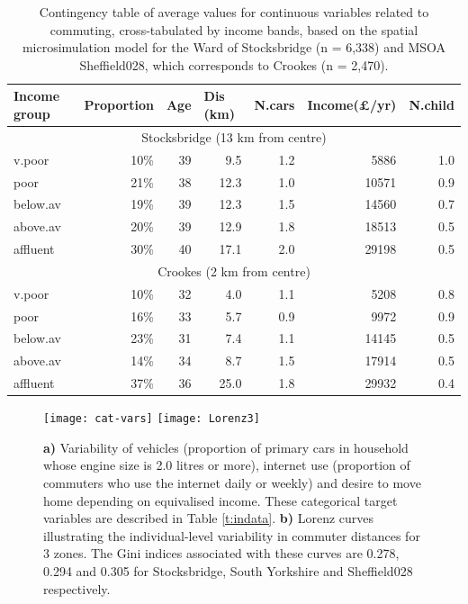 \begin{table}[h*]
\caption[Commuting characteristics cross-tabulated by income bands]
{Contingency table of average values for continuous variables related to commuting,
cross-tabulated by income bands, based on the spatial microsimulation
model for the Ward of Stocksbridge (n = 6,338) and MSOA Sheffield028, which
corresponds to Crookes (n = 2,470).}
\begin{center}
\begin{tabular}{lrrrrrr}
\toprule
Income group & \multicolumn{1}{l}{Proportion} & \multicolumn{1}{l}{Age} &
\multicolumn{1}{l}{Dis (km)} & \multicolumn{1}{l}{N.cars} &
\multicolumn{1}{l}{Income(\pounds/yr)} & \multicolumn{1}{l}{N.child} \\ \midrule
\multicolumn{7}{c}{Stocksbridge (13 km from centre)} \\ \midrule
v.poor & 10\% & 39 & 9.5 & 1.2 & 5886 & 1.0 \\ 
poor & 21\% & 38 & 12.3 & 1.0 & 10571 & 0.9 \\ 
below.av & 19\% & 39 & 12.3 & 1.5 & 14560 & 0.7 \\ 
above.av & 20\% & 39 & 12.9 & 1.8 & 18513 & 0.5 \\ 
affluent & 30\% & 40 & 17.1 & 2.0 & 29198 & 0.5 \\ \midrule
\multicolumn{7}{c}{Crookes (2 km from centre)} \\ \midrule
v.poor &  10\% & 32 & 4.0 & 1.1 & 5208 & 0.8 \\ 
poor & 16\% & 33 & 5.7 & 0.9 & 9972 & 0.9 \\ 
below.av & 23\% & 31 & 7.4 & 1.1 & 14145 & 0.5 \\ 
above.av & 14\% & 34 & 8.7 & 1.5 & 17914 & 0.5 \\ 
affluent & 37\% & 36 & 25.0 & 1.8 & 29932 & 0.4 \\
\bottomrule
\end{tabular}             \end{center}
\label{t:msim-res2}
\end{table}

\begin{figure}[h*]
 \centering
\texttt{[image: cat-vars]}
\texttt{[image: Lorenz3]}
 \caption[a) Income and household traits; b) Lorenz curves of commute distances]
 {\textbf{a)} Variability of vehicles (proportion of primary cars in household
whose engine size is 2.0 litres or more), internet use (proportion of
commuters who use the internet daily or weekly) and desire to move home
depending on equivalised income. These categorical target variables are
described in Table \ref{t:indata}. \textbf{b)} Lorenz curves illustrating the
individual-level variability in
commuter distances for 3 zones. The Gini indices associated with these curves
are 0.278, 0.294 and 0.305 for Stocksbridge, South Yorkshire and Sheffield028
respectively.}
 \label{fig:cat-vars}
\end{figure}

